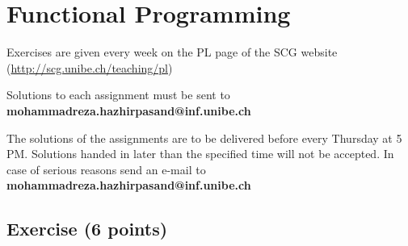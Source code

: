 \documentclass [11pt, a4wide, twoside]{article}
\begin{document}
\section*{\space{} Functional Programming}


\begin{myitemize}
\item Exercises are given every week on the PL page of the SCG website \\ (\url{http://scg.unibe.ch/teaching/pl})
\item Solutions to each assignment must be sent to \textbf{mohammadreza.hazhirpasand@inf.unibe.ch}
\item The solutions of the assignments are to be delivered before every Thursday at 5 PM. Solutions handed in later than the specified time will not be accepted. In case of serious reasons send an e-mail to  \textbf{mohammadreza.hazhirpasand@inf.unibe.ch}
\end{myitemize}


\subsection*{Exercise (6 points)}
\end{document}
